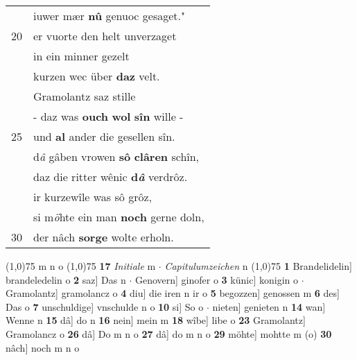 \documentclass[8pt,a4paper,notitlepage]{article}
\begin{document}
\begin{table}[ht]
\begin{minipage}[t]{0.5\linewidth}
\begin{tabular}{rl}
 & iuwer mær \textbf{nû} genuoc gesaget."\\ 
20 & er vuorte den helt unverzaget\\ 
 & in ein minner gezelt\\ 
 & kurzen wec über \textbf{daz} velt.\\ 
 & Gramolantz saz stille\\ 
 & - daz was \textbf{ouch} \textbf{wol} \textbf{sîn} wille -\\ 
25 & und \textbf{al} ander die gesellen sîn.\\ 
 & d\textit{â} gâben vrowen \textbf{sô} \textbf{clâren} schîn,\\ 
 & daz die ritter wênic \textbf{d\textit{â}} verdrôz.\\ 
 & ir kurzewîle was sô grôz,\\ 
 & si m\textit{ö}hte ein man \textbf{noch} gerne doln,\\ 
30 & der nâch \textbf{sorge}  wolte erholn.\\ 
\end{tabular}
\scriptsize
\line(1,0){75} \newline
m n o \newline
\line(1,0){75} \newline
\textbf{17} \textit{Initiale} m   $\cdot$ \textit{Capitulumzeichen} n  \newline
\line(1,0){75} \newline
\textbf{1} Brandelidelin] brandeledelin o \textbf{2} saz] Das n  $\cdot$ Genovern] ginofer o \textbf{3} künic] konigin o  $\cdot$ Gramolantz] gramolancz o \textbf{4} diu] die iren n ir o \textbf{5} begozzen] genossen m \textbf{6} des] Das o \textbf{7} unschuldige] vnschulde n o \textbf{10} si] So o  $\cdot$ nieten] genieten n \textbf{14} wan] Wenne n \textbf{15} dâ] do n \textbf{16} nein] mein m \textbf{18} wîbe] libe o \textbf{23} Gramolantz] Gramolancz o \textbf{26} dâ] Do m n o \textbf{27} dâ] do m n o \textbf{29} möhte] mohtte m (o) \textbf{30} nâch] noch m n o \newline
\end{minipage}
\end{table}
\newpage
\end{document}
